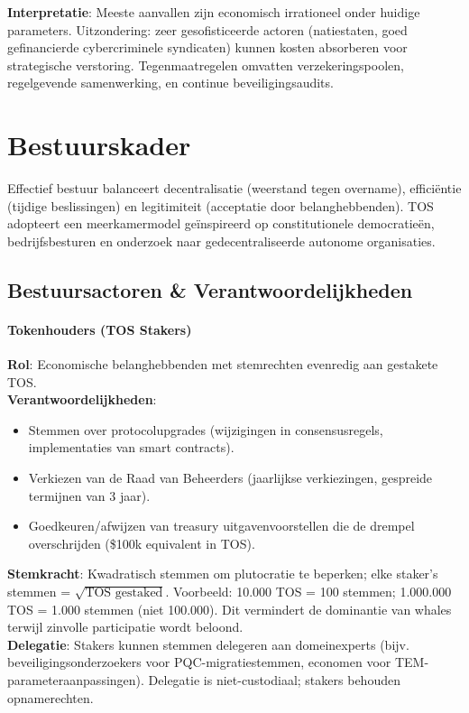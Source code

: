 \documentclass[11pt]{article}
\begin{document}
\textbf{Interpretatie}: Meeste aanvallen zijn economisch irrationeel onder huidige parameters. Uitzondering: zeer gesofisticeerde actoren (natiestaten, goed gefinancierde cybercriminele syndicaten) kunnen kosten absorberen voor strategische verstoring. Tegenmaatregelen omvatten verzekeringspoolen, regelgevende samenwerking, en continue beveiligingsaudits.

\section{Bestuurskader}
\label{sec:governance}

Effectief bestuur balanceert decentralisatie (weerstand tegen overname), efficiëntie (tijdige beslissingen) en legitimiteit (acceptatie door belanghebbenden). TOS adopteert een meerkamermodel geïnspireerd op constitutionele democratieën, bedrijfsbesturen en onderzoek naar gedecentraliseerde autonome organisaties.

\subsection{Bestuursactoren \& Verantwoordelijkheden}

\paragraph{Tokenhouders (TOS Stakers)}
\textbf{Rol}: Economische belanghebbenden met stemrechten evenredig aan gestakete TOS.\\
\textbf{Verantwoordelijkheden}:
\begin{itemize}[noitemsep]
  \item Stemmen over protocolupgrades (wijzigingen in consensusregels, implementaties van smart contracts).
  \item Verkiezen van de Raad van Beheerders (jaarlijkse verkiezingen, gespreide termijnen van 3 jaar).
  \item Goedkeuren/afwijzen van treasury uitgavenvoorstellen die de drempel overschrijden (\$100k equivalent in TOS).
\end{itemize}
\textbf{Stemkracht}: Kwadratisch stemmen om plutocratie te beperken; elke staker's stemmen = $\sqrt{\text{TOS gestaked}}$. Voorbeeld: 10.000 TOS = 100 stemmen; 1.000.000 TOS = 1.000 stemmen (niet 100.000). Dit vermindert de dominantie van whales terwijl zinvolle participatie wordt beloond.\\
\textbf{Delegatie}: Stakers kunnen stemmen delegeren aan domeinexperts (bijv. beveiligingsonderzoekers voor PQC-migratiestemmen, economen voor TEM-parameteraanpassingen). Delegatie is niet-custodiaal; stakers behouden opnamerechten.
\end{document}
